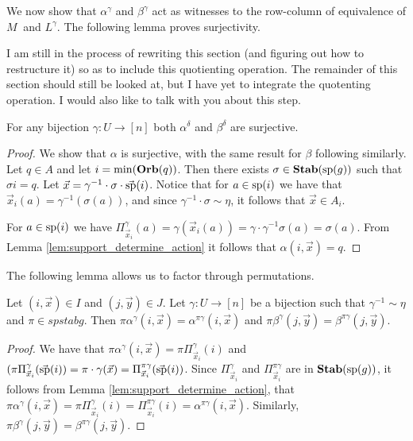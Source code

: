 \documentclass[../paper.tex]{subfiles}
\begin{document}
We now show that $\alpha^{\gamma}$ and $\beta^{\gamma}$ act as witnesses to the
row-column of equivalence of $M_{~}$ and $L^{\gamma}$. The following lemma
proves surjectivity.

\begin{remark}
  I am still in the process of rewriting this section (and figuring out how to
  restructure it) so as to include this quotienting operation. The remainder of
  this section should still be looked at, but I have yet to integrate the
  quotenting operation. I would also like to talk with you about this step.
\end{remark}

\begin{lem} 
  For any bijection $\gamma : U \rightarrow [n]$ both $\alpha^{\delta}$ and
  $\beta^{\delta}$ are surjective.
\end{lem}
\begin{proof}
  We show that $\alpha$ is surjective, with the same result for $\beta$
  following similarly. Let $q \in A$ and let $i = \min (\text{\textbf{Orb}} (q))$. Then there
  exists $\sigma \in \text{\textbf{Stab}} (\text{sp} (g))$ such that $\sigma i = q$. Let $\vec{x} =
  \gamma^{-1} \cdot \sigma \cdot \vec{\text{sp}}(i)$. Notice that for $a \in \text{sp}(i)$ we
  have that $\vec{x}_i(a) = \gamma^{-1} (\sigma (a))$, and since $\gamma^{-1}
  \cdot \sigma \sim \eta$, it follows that $\vec{x} \in A_i$.

  For $a \in \text{sp}(i)$ we have $\Pi^{\gamma}_{\vec{x}_i} (a) = \gamma
  (\vec{x}_i(a)) = \gamma \cdot \gamma^{-1} \sigma (a) = \sigma (a)$. From Lemma
  \ref{lem:support_determine_action} it follows that $\alpha(i, \vec{x}) = q$.
\end{proof}

The following lemma allows us to factor through permutations.
\begin{lem}
  \label{lem:alpha_and_gamma}
  Let $(i,\vec{x}) \in I$ and $(j, \vec{y}) \in J$. Let $\gamma: U \rightarrow
  [n]$ be a bijection such that $\gamma^{-1} \sim \eta$ and $\pi \in spstab{g}$.
  Then $\pi \alpha^{\gamma}(i, \vec{x}) = \alpha^{\pi \gamma}(i, \vec{x})$ and
  $\pi \beta^{\gamma}(j, \vec{y}) = \beta^{\pi \gamma}(j, \vec{y})$.
\end{lem}
\begin{proof}
  We have that $\pi \alpha^{\gamma}(i, \vec{x}) = \pi
  \Pi^{\gamma}_{\vec{x}_i}(i)$ and $(\pi
  \Pi^{\gamma}_{\vec{x}_{i}}(\vec{\text{sp}}(i)) = \pi \cdot \gamma (\vec{x}) =
  \Pi^{\pi \gamma}_{\vec{x}_i}(\vec{\text{sp}}(i))$. Since
  $\Pi^{\gamma}_{\vec{x}_i}$ and $\Pi^{\pi \gamma}_{\vec{x}_i}$ are in
  $\text{\textbf{Stab}} (\text{sp} (g))$, it follows from Lemma \ref{lem:support_determine_action}, that
  $\pi \alpha^{\gamma}(i, \vec{x}) = \pi \Pi^{\gamma}_{\vec{x}_i} (i) = \Pi^{\pi
    \gamma}_{\vec{x}_i}(i) = \alpha^{\pi \gamma}(i, \vec{x})$. Similarly, $\pi
  \beta^{\gamma}(j, \vec{y}) = \beta^{\pi \gamma} (j, \vec{y})$.
\end{proof}
\end{document}
